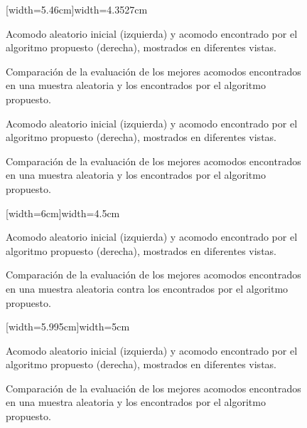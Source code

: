 \vfill%
\begin{figure}[H]
	[width=5.46cm]{width=4.3527cm}%
	\caption{Acomodo aleatorio inicial (izquierda) y acomodo encontrado por el algoritmo propuesto (derecha), mostrados en diferentes vistas.}%
\end{figure}
%
\begin{figure}[H]
	\caption{Comparación de la evaluación de los mejores acomodos encontrados en una muestra aleatoria y los encontrados por el algoritmo propuesto.}%
\end{figure}
\vfill%
\begin{figure}[H]
	\caption{Acomodo aleatorio inicial (izquierda) y acomodo encontrado por el algoritmo propuesto (derecha), mostrados en diferentes vistas.}%
\end{figure}%
%
\begin{figure}[H]
	\caption{Comparación de la evaluación de los mejores acomodos encontrados en una muestra aleatoria y los encontrados por el algoritmo propuesto.}%
\end{figure}
\vfill%
\begin{figure}[H]
	[width=6cm]{width=4.5cm}%
	\caption{Acomodo aleatorio inicial (izquierda) y acomodo encontrado por el algoritmo propuesto (derecha), mostrados en diferentes vistas.}%
\end{figure}
%
\begin{figure}[H]
	\caption{Comparación de la evaluación de los mejores acomodos encontrados en una muestra aleatoria contra los encontrados por el algoritmo propuesto.}%
\end{figure}
\vspace{10pt}%
\begin{figure}[H]
	[width=5.995cm]{width=5cm}%
	\caption{Acomodo aleatorio inicial (izquierda) y acomodo encontrado por el algoritmo propuesto (derecha), mostrados en diferentes vistas.}%
\end{figure}
%
\setlength\intextsep{4pt}
\begin{figure}[H]
	\caption{Comparación de la evaluación de los mejores acomodos encontrados en una muestra aleatoria y los encontrados por el algoritmo propuesto.}%
\end{figure}
